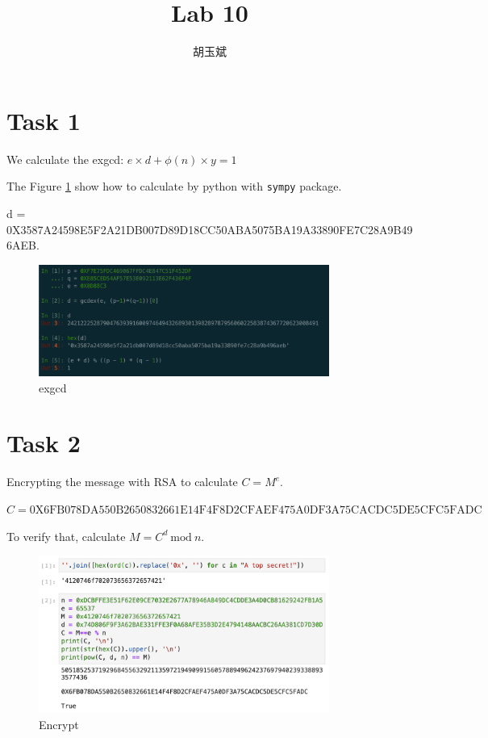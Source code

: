\documentclass[onecolumn,oneside]{SUSTechHomework}
\author{胡玉斌}
\title{Lab 10}
\begin{document}
  \maketitle

  \section*{Task 1}

  We calculate the exgcd: $e \times d + \phi(n) \times y = 1$

  The Figure \ref{fig1} show how to calculate by python with \verb|sympy| package.

  d = 0X3587A24598E5F2A21DB007D89D18CC50ABA5075BA19A33890FE7C28A9B496AEB.

  \begin{figure}[H]
    \centering
    \includegraphics[width=0.85\textwidth]{img/task1_1.png}
    \caption{exgcd}
    \label{fig1}
  \end{figure}

  \section*{Task 2}

  Encrypting the message with RSA to calculate $C = M^e$.

  $C = \mbox{0X6FB078DA550B2650832661E14F4F8D2CFAEF475A0DF3A75CACDC5DE5CFC5FADC}$

  To verify that, calculate $M=C^d~\mbox{mod}~n$.

  \begin{figure}[H]
    \centering
    \includegraphics[width=0.85\textwidth]{img/task2_1.png}
    \caption{Encrypt}
  \end{figure}
\end{document}
